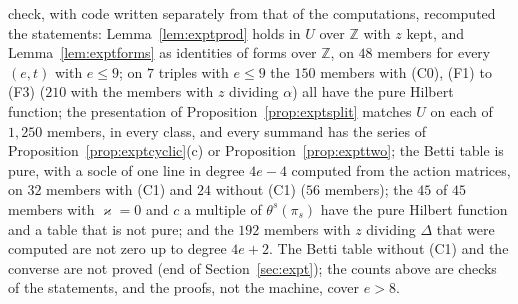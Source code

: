 \documentclass[11pt]{article}
\theoremstyle{definition}
\theoremstyle{remark}
\begin{document}
check, with code written separately from that of the computations, recomputed the statements: Lemma~\ref{lem:exptprod} holds in $U$ over $\mathbb Z$ with $z$ kept, and Lemma~\ref{lem:exptforms} as identities of forms over $\mathbb Z$, on $48$ members for every $(e,t)$ with $e\le9$; on $7$ triples with $e\le9$ the $150$ members with (C0), (F1) to (F3) ($210$ with the members with $z$ dividing $\alpha$) all have the pure Hilbert function; the presentation of Proposition~\ref{prop:exptsplit} matches $U$ on each of $1{,}250$ members, in every class, and every summand has the series of Proposition~\ref{prop:exptcyclic}(c) or Proposition~\ref{prop:expttwo}; the Betti table is pure, with a socle of one line in degree $4e-4$ computed from the action matrices, on $32$ members with (C1) and $24$ without (C1) ($56$ members); the $45$ of $45$ members with $\varkappa=0$ and $c$ a multiple of $\theta^s(\pi_s)$ have the pure Hilbert function and a table that is not pure; and the $192$ members with $z$ dividing $\Delta$ that were computed are not zero up to degree $4e+2$. The Betti table without (C1) and the converse are not proved (end of Section~\ref{sec:expt}); the counts above are checks of the statements, and the proofs, not the machine, cover $e>8$.
\end{document}
